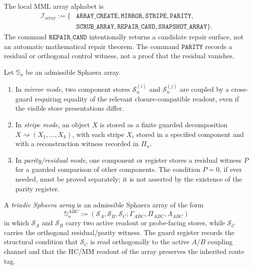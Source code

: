 \begin{definition}\label{def:sphaera-array-instructions}
The local MML array alphabet is
\[
\begin{aligned}
  \mathcal I_{\mathrm{array}}
  :=\{&\texttt{ARRAY\_CREATE},\texttt{MIRROR},\texttt{STRIPE},\texttt{PARITY},\\
       &\texttt{SCRUB\_ARRAY},\texttt{REPAIR\_CAND},\texttt{SNAPSHOT\_ARRAY}\}.
\end{aligned}
\]
The command \(\texttt{REPAIR\_CAND}\) intentionally returns a candidate repair surface, not an automatic mathematical repair theorem. The command \(\texttt{PARITY}\) records a residual or orthogonal control witness, not a proof that the residual vanishes.
\end{definition}

\begin{definition}\label{def:sphaera-array-modes}
Let \(\mathbb S_n\) be an admissible Sphaera array.
\begin{enumerate}[leftmargin=2em]
  \item In \emph{mirror mode}, two component stores \(\mathcal S_n^{(i)}\) and \(\mathcal S_n^{(j)}\) are coupled by a cross-guard requiring equality of the relevant closure-compatible readout, even if the visible store presentations differ.
  \item In \emph{stripe mode}, an object \(X\) is stored as a finite guarded decomposition \(X\rightsquigarrow(X_1,\ldots,X_k)\), with each stripe \(X_i\) stored in a specified component and with a reconstruction witness recorded in \(\Pi_n\).
  \item In \emph{parity/residual mode}, one component or register stores a residual witness \(P\) for a guarded comparison of other components. The condition \(P=0\), if ever needed, must be proved separately; it is not asserted by the existence of the parity register.
\end{enumerate}
\end{definition}

\begin{definition}\label{def:triadic-sphaera-array}
A \emph{triadic Sphaera array} is an admissible Sphaera array of the form
\[
  \mathbb S_n^{ABC}
  :=
  (\mathcal S_A,\mathcal S_B,\mathcal S_C;\Gamma_{ABC},\Pi_{ABC},\Lambda_{ABC})
\]
in which \(\mathcal S_A\) and \(\mathcal S_B\) carry two active readout or probe-facing stores, while \(\mathcal S_C\) carries the orthogonal residual/parity witness. The guard register records the structural condition that \(\mathcal S_C\) is read orthogonally to the active \(A/B\) coupling channel and that the HC/MM readout of the array preserves the inherited route tag.
\end{definition}

